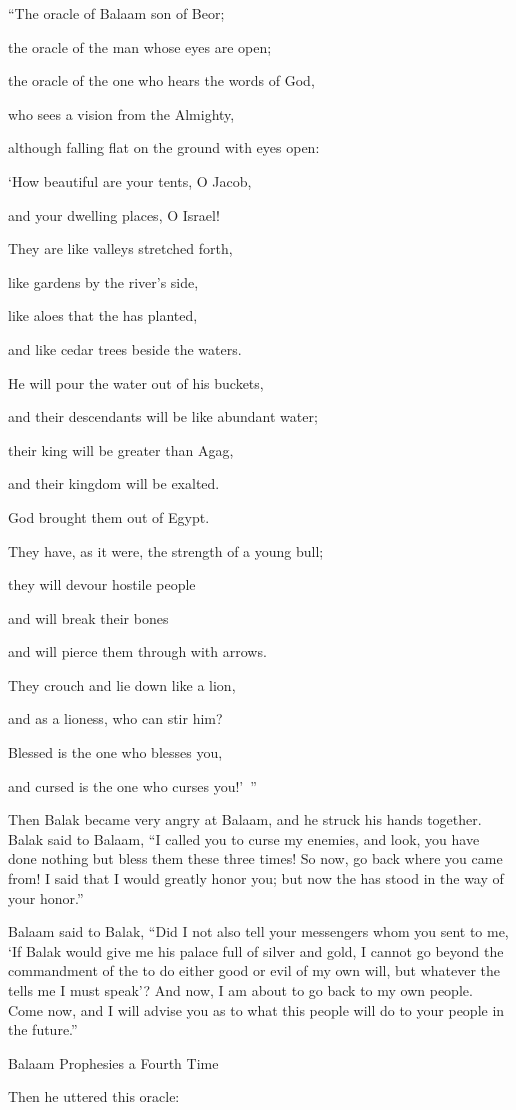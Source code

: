 {\par }{\Q “The oracle
of Balaam
son
of Beor;
\par }{\Q the oracle
of the man
whose eyes are open;
\par }{\Q {}the oracle
of the one who hears
the words
of God,
\par }{\Q who
sees a vision
from the Almighty,
\par }{\Q although falling
flat
on
the ground with
eyes
open:
\par }{\Q {}‘How
beautiful
are your tents,
O Jacob,
\par }{\Q and your dwelling places,
O Israel!
\par }{\Q {}They are like valleys
stretched
forth,
\par }{\Q like gardens
by the river’s side,
\par }{\Q like aloes
that the
{}
has planted,
\par }{\Q and like cedar
trees beside
the waters.
\par }{\Q {}He will pour
the water
out of his buckets,
\par }{\Q and their descendants
will be like abundant
water;
\par }{\Q their king
will be greater
than
Agag,
\par }{\Q and their kingdom
will be exalted.
\par }{\Q {}God
brought them out
of Egypt.
\par }{\Q They have, as it were, the strength
of a young bull;
\par }{\Q they will devour
hostile
people

\par }{\Q and will break their
bones
\par }{\Q and will pierce
them through with arrows.
\par }{\Q {}They crouch
and lie
down like a lion,
\par }{\Q and as a lioness,
who can
stir
him?
\par }{\Q Blessed
is the one who blesses
you,
\par }{\Q and cursed
is the one who curses you!’ ”
\par }{\PP {}Then Balak
became very angry
at Balaam,
and he struck
his hands
together. Balak
said
to
Balaam,
“I called
you to curse
my enemies,
and look,
you have done nothing but bless
them these
three
times!
So now,
go back
where
you came
from! I said
that I would
greatly honor
you; but now
the {}
has stood
in the way
of your honor.”
\par }{\PP {}Balaam
said
to
Balak,
“Did I not
also
tell
your messengers
whom
you sent
to me,
‘If
Balak
would give
me his palace
full
of silver
and gold,
I cannot
go beyond
the
commandment
of the {}
to do
either good
or
evil
of my own will, but whatever
the {}
tells
me I must
speak’?
And now,
I am
about to go
back to my own people.
Come
now, and I will advise
you as
to what
this
people
will do
to your people
in the future.”
\par }{\SH Balaam Prophesies a Fourth Time
\par }{\PP {}Then
he uttered
this oracle:

}
